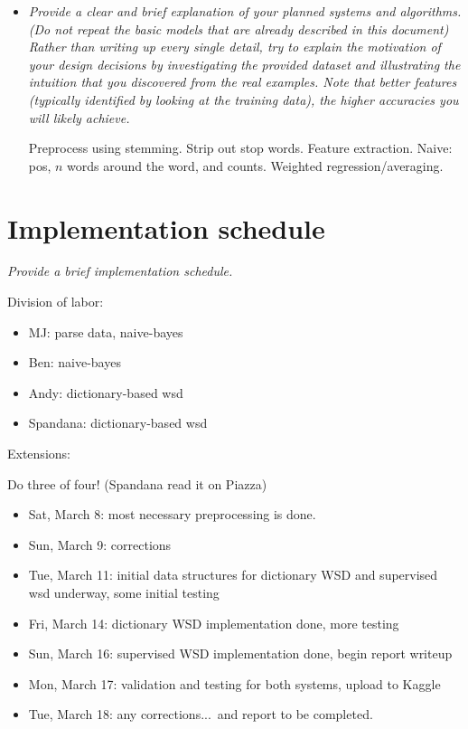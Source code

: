 \documentclass{article}
\begin{document}
\begin{itemize}
\item \textit{Provide a clear and brief explanation of your planned systems and algorithms. (Do not repeat the basic models that are already described in this document) Rather than writing up every single detail, try to explain the motivation of your design decisions by investigating the provided dataset and illustrating the intuition that you discovered from the real examples. Note that better features (typically identified by looking at the training data), the higher accuracies you will likely achieve.}\par

Preprocess using stemming. Strip out stop words. Feature extraction. Naive: pos, $n$ words around the word, and counts. Weighted regression/averaging.

\end{itemize}

\section{Implementation schedule}
\textit{Provide a brief implementation schedule.}\par

Division of labor:
\begin{itemize}[noitemsep]
\item MJ: parse data, naive-bayes
\item Ben: naive-bayes
\item Andy: dictionary-based wsd
\item Spandana: dictionary-based wsd
\end{itemize}

Extensions:\par
Do three of four! (Spandana read it on Piazza)

\begin{itemize}[noitemsep]
\item Sat, March 8: most necessary preprocessing is done.
\item Sun, March 9: corrections
\item Tue, March 11: initial data structures for dictionary WSD and supervised wsd underway, some initial testing
\item Fri, March 14: dictionary WSD implementation done, more testing
\item Sun, March 16: supervised WSD implementation done, begin report writeup
\item Mon, March 17: validation and testing for both systems, upload to Kaggle
\item Tue, March 18: any corrections...\ and report to be completed.
\end{itemize}
\end{document}
